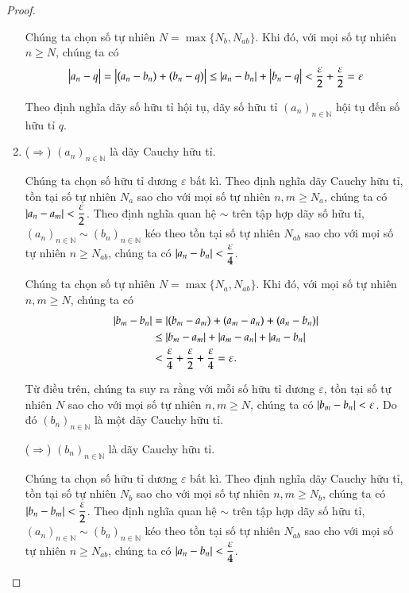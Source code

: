 \begin{proof}
\begin{enumerate}[label={(\roman*)},itemsep=0pt]
              Chúng ta chọn số tự nhiên $N = \max\{ N_{b}, N_{ab} \}$. Khi đó, với mọi số tự nhiên $n\geq N$, chúng ta có
              \[
                  \left\vert{a_{n} - q}\right\vert = \left\vert{(a_{n} - b_{n}) + (b_{n} - q)}\right\vert \leq \left\vert{a_{n} - b_{n}}\right\vert + \left\vert{b_{n} - q}\right\vert < \frac{\varepsilon}{2} + \frac{\varepsilon}{2} = \varepsilon
              \]

              Theo định nghĩa dãy số hữu tỉ hội tụ, dãy số hữu tỉ ${(a_{n})}_{n\in\mathbb{N}}$ hội tụ đến số hữu tỉ $q$.
        \item ($\Rightarrow$) ${(a_{n})}_{n\in\mathbb{N}}$ là dãy Cauchy hữu tỉ.

              Chúng ta chọn số hữu tỉ dương $\varepsilon$ bất kì. Theo định nghĩa dãy Cauchy hữu tỉ, tồn tại số tự nhiên $N_{a}$ sao cho với mọi số tự nhiên $n, m\geq N_{a}$, chúng ta có $\left\vert{a_{n} - a_{m}}\right\vert < \dfrac{\varepsilon}{2}$. Theo định nghĩa quan hệ $\sim$ trên tập hợp dãy số hữu tỉ, ${(a_{n})}_{n\in\mathbb{N}}\sim {(b_{n})}_{n\in\mathbb{N}}$ kéo theo tồn tại số tự nhiên $N_{ab}$ sao cho với mọi số tự nhiên $n \geq N_{ab}$, chúng ta có $\left\vert{a_{n} - b_{n}}\right\vert < \dfrac{\varepsilon}{4}$.

              Chúng ta chọn số tự nhiên $N = \max\{ N_{a}, N_{ab} \}$. Khi đó, với mọi số tự nhiên $n, m\geq N$, chúng ta có
              \begin{align*}
                  \left\vert{b_{m} - b_{n}}\right\vert & = \left\vert{(b_{m} - a_{m}) + (a_{m} - a_{n}) + (a_{n} - b_{n})}\right\vert                            \\
                                      & \leq \left\vert{b_{m} - a_{m}}\right\vert + \left\vert{a_{m} - a_{n}}\right\vert + \left\vert{a_{n} - b_{n}}\right\vert                   \\
                                      & < \frac{\varepsilon}{4} + \frac{\varepsilon}{2} + \frac{\varepsilon}{4} = \varepsilon.
              \end{align*}

              Từ điều trên, chúng ta suy ra rằng với mỗi số hữu tỉ dương $\varepsilon$, tồn tại số tự nhiên $N$ sao cho với mọi số tự nhiên $n, m\geq N$, chúng ta có $\left\vert{b_{m} - b_{n}}\right\vert < \varepsilon$. Do đó ${(b_{n})}_{n\in\mathbb{N}}$ là một dãy Cauchy hữu tỉ.

              ($\Rightarrow$) ${(b_{n})}_{n\in\mathbb{N}}$ là dãy Cauchy hữu tỉ.

              Chúng ta chọn số hữu tỉ dương $\varepsilon$ bất kì. Theo định nghĩa dãy Cauchy hữu tỉ, tồn tại số tự nhiên $N_{b}$ sao cho với mọi số tự nhiên $n, m\geq N_{b}$, chúng ta có $\left\vert{b_{n} - b_{m}}\right\vert < \dfrac{\varepsilon}{2}$. Theo định nghĩa quan hệ $\sim$ trên tập hợp dãy số hữu tỉ, ${(a_{n})}_{n\in\mathbb{N}}\sim {(b_{n})}_{n\in\mathbb{N}}$ kéo theo tồn tại số tự nhiên $N_{ab}$ sao cho với mọi số tự nhiên $n \geq N_{ab}$, chúng ta có $\left\vert{a_{n} - b_{n}}\right\vert < \dfrac{\varepsilon}{4}$.


\end{enumerate}
\end{proof}
